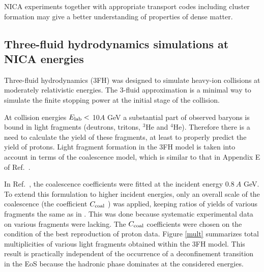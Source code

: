 \documentclass[epj]{svjour}
\begin{document}
NICA experiments together with appropriate transport codes including cluster formation may give a better understanding of properties of dense matter.

\subsection{Three-fluid hydrodynamics simulations at NICA energies}

Three-fluid hydrodynamics (3FH) \cite{Ivanov:2005yw} was designed to simulate heavy-ion collisions at moderately relativistic energies. 
The 3-fluid approximation is a minimal way to simulate the finite
stopping power at the initial stage of the collision. 

At collision energies $E_{\rm{lab}} <$ 10$A$ GeV a substantial part of observed 
baryons is bound in light fragments (deutrons, tritons, $^3$He and $^4$He). 
Therefore there is a need to calculate the yield of these fragments, 
at least to properly predict the yield of protons. 
Light fragment formation in the 3FH model is
taken into account in terms of the coalescence model, which is similar
to that in  Appendix E of Ref.~\cite{Russkikh:1993ct}.  

In Ref.~\cite{Russkikh:1993ct}, the coalescence coefficients were fitted at the
incident energy $0.8~A$ GeV. 
To extend this formulation to higher incident energies, only an overall scale of
the coalescence (the coefficient $C_{\rm{coal}}$ \cite{Ivanov:2005yw}) 
was applied, keeping ratios of yields of various fragments the same as in \cite{Russkikh:1993ct}. 
This was done because systematic experimental data on various fragments were lacking. 
The $C_{\rm{coal}}$ coefficients were chosen on the condition of the best 
reproduction of proton data. 
Figure \ref{mult} summarizes total multiplicities of various light fragments 
obtained within the 3FH model. This result is practically independent of the occurrence 
of a deconfinement transition in the EoS because the hadronic phase dominates at 
the considered energies. 
\end{document}
